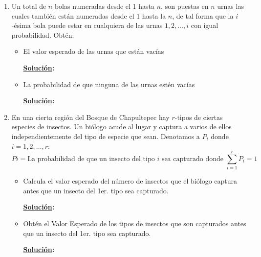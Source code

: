 \documentclass[11pt,letterpaper]{report}
\newcommand{\sol}{\textbf{\underline{Solución}: }} %
\begin{document}
\begin{enumerate}
\item Un total de $n$ bolas numeradas desde el 1 hasta $n$, son puestas en $n$ urnas las cuales
también están numeradas desde el 1 hasta la $n$, de tal forma que la $i$-ésima bola puede estar en
cualquiera de las urnas $1,2,\ldots,i$ con igual probabilidad. Obtén:
\begin{itemize}
    \item El valor esperado de las urnas que están vacías
    
    \sol

    \item La probabilidad de que ninguna de las urnas estén vacías
    
    \sol
\end{itemize}

\item En una cierta región del Bosque de Chapultepec hay $r$-tipos de ciertas especies de insectos.
Un biólogo acude al lugar y captura a varios de ellos independientemente del tipo de especie que
sean. Denotamos a $P_i$ donde $i = 1,2,\ldots,r$:
\[
    Pi = \text{La probabilidad de que un insecto del tipo $i$ sea capturado donde } \sum_{i=1}^r P_i = 1
\]
\begin{itemize}
    \item Calcula el valor esperado del número de insectos que el biólogo captura antes que un
    insecto del 1er. tipo sea capturado. 

    \sol

    \item Obtén el Valor Esperado de los tipos de insectos que son capturados antes que un insecto
    del 1er. tipo sea capturado.

    \sol
\end{itemize}

\end{enumerate}



\end{document}
